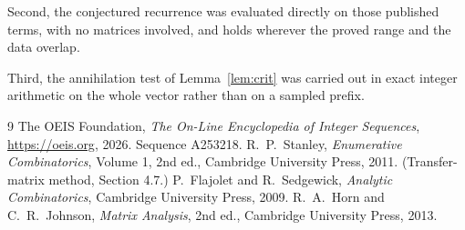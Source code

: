 \documentclass[11pt,a4paper]{article}
\theoremstyle{plain}
\theoremstyle{definition}
\begin{document}
Second, the conjectured recurrence was evaluated directly on those published terms, with no
matrices involved, and holds wherever the proved range and the data overlap.

Third, the annihilation test of Lemma~\ref{lem:crit} was carried out in exact integer
arithmetic on the whole vector rather than on a sampled prefix.

\begin{thebibliography}{9}
 The OEIS Foundation, \emph{The On-Line Encyclopedia of Integer
Sequences}, \url{https://oeis.org}, 2026. Sequence A253218.
 R.~P.~Stanley, \emph{Enumerative Combinatorics}, Volume 1, 2nd ed.,
Cambridge University Press, 2011. (Transfer-matrix method, Section 4.7.)
 P.~Flajolet and R.~Sedgewick, \emph{Analytic Combinatorics}, Cambridge
University Press, 2009.
 R.~A.~Horn and C.~R.~Johnson, \emph{Matrix Analysis}, 2nd ed., Cambridge
University Press, 2013.
\end{thebibliography}
\end{document}
